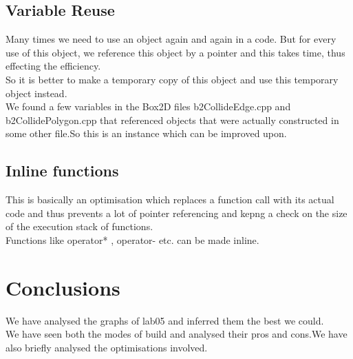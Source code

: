 \documentclass[11pt]{article}
\begin{document}
\subsection{Variable Reuse}
Many times we need to use an object again and again in a code. But for every use of this object, we reference this object by a pointer and this takes time, thus effecting the efficiency. \\
So it is better to make a temporary copy of this object and use this temporary object instead.\\
We found a few variables in the Box2D files b2CollideEdge.cpp and b2CollidePolygon.cpp that referenced objects that were actually constructed in some other file.So this is an instance which can be improved upon.

\subsection{Inline functions}
This is basically an optimisation which replaces a function call with its actual code and thus prevents a lot of pointer referencing and kepng a check on the size of the execution stack of functions.\\
Functions like operator* , operator- etc. can be made inline.

\section{Conclusions}
We have analysed the graphs of lab05 and inferred them the best we could.\\
We have seen both the modes of build and analysed their pros and cons.We have also briefly analysed the optimisations involved.



\cite{rollingBodies}
\cite{RubeGoldbergmachineWiki}
\cite{RubeGoldbergHome}
\cite{stackoverflow}
\end{document}
